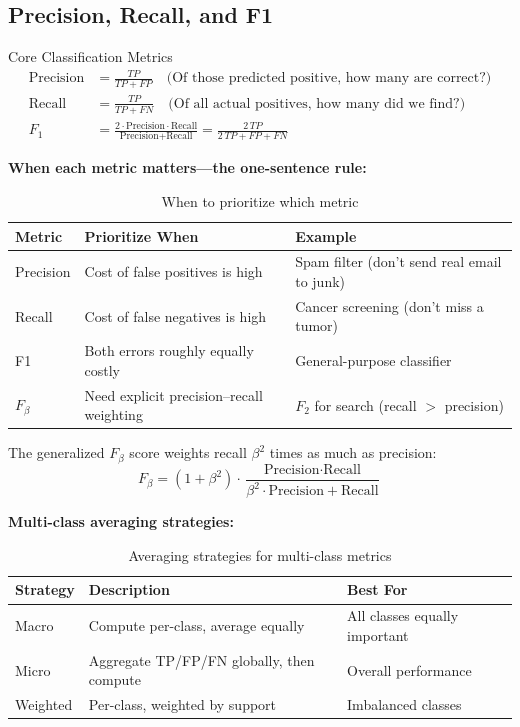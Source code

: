 \subsection{Precision, Recall, and F1}

\begin{mathresult}{Core Classification Metrics}
\begin{align}
\text{Precision} &= \frac{TP}{TP + FP} \quad \text{(Of those predicted positive, how many are correct?)} \\[6pt]
\text{Recall} &= \frac{TP}{TP + FN} \quad \text{(Of all actual positives, how many did we find?)} \\[6pt]
F_1 &= \frac{2 \cdot \text{Precision} \cdot \text{Recall}}{\text{Precision} + \text{Recall}} = \frac{2\,TP}{2\,TP + FP + FN}
\end{align}
\end{mathresult}

\textbf{When each metric matters---the one-sentence rule:}

\begin{table}[H]
\centering
\caption{When to prioritize which metric}
\begin{tabularx}{\textwidth}{lXX}
\toprule
\textbf{Metric} & \textbf{Prioritize When} & \textbf{Example} \\
\midrule
Precision & Cost of false positives is high & Spam filter (don't send real email to junk) \\
Recall & Cost of false negatives is high & Cancer screening (don't miss a tumor) \\
F1 & Both errors roughly equally costly & General-purpose classifier \\
$F_\beta$ & Need explicit precision--recall weighting & $F_2$ for search (recall $>$ precision) \\
\bottomrule
\end{tabularx}
\end{table}

The generalized $F_\beta$ score weights recall $\beta^2$ times as much as precision:
\[
F_\beta = (1 + \beta^2) \cdot \frac{\text{Precision} \cdot \text{Recall}}{\beta^2 \cdot \text{Precision} + \text{Recall}}
\]

\textbf{Multi-class averaging strategies:}

\begin{table}[H]
\centering
\caption{Averaging strategies for multi-class metrics}
\begin{tabularx}{\textwidth}{lXl}
\toprule
\textbf{Strategy} & \textbf{Description} & \textbf{Best For} \\
\midrule
Macro & Compute per-class, average equally & All classes equally important \\
Micro & Aggregate TP/FP/FN globally, then compute & Overall performance \\
Weighted & Per-class, weighted by support & Imbalanced classes \\
\bottomrule
\end{tabularx}
\end{table}

